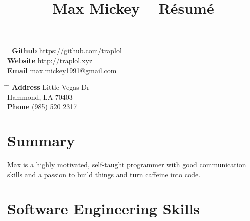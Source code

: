 \documentclass[10pt]{article} %
\begin{document}
\raggedright


\title{Max Mickey -- Résumé}


\parbox{0.5\textwidth}{ %
\begin{tabbing}
\hspace{2cm} \= \hspace{3cm} \= \kill 
\textbf {Github} \> \href{https://github.com/traplol}{https://github.com/traplol} \\
\textbf {Website} \> \href{http://traplol.xyz}{http://traplol.xyz} \\
\textbf {Email} \> \href{mailto:max.mickey1991@gmail.com}{max.mickey1991@gmail.com} \\
\end{tabbing}}
\hfill
\parbox{0.5\textwidth}{ %
\begin{tabbing}
\hspace{2cm} \= \hspace{3cm} \= \kill
\textbf {Address}  Little Vegas Dr\\ %
\> Hammond, LA 70403 \\ %
\textbf {Phone} \> (985) 520 2317 \\
\end{tabbing}}


\vspace{-4mm}
\section{Summary}
\vspace{-3mm}

Max is a highly motivated, self-taught programmer with good communication skills and a
passion to build things and turn caffeine into code.

\vspace{-4mm}
\section{Software Engineering Skills}
\vspace{-3mm}
\end{document}
